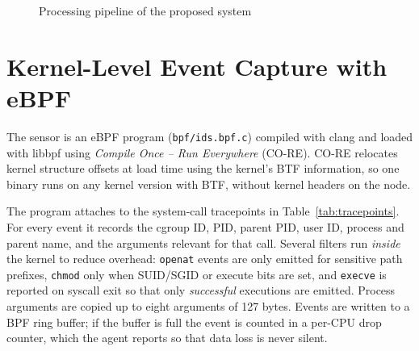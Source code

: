 \begin{figure}[H]
\caption{Processing pipeline of the proposed system}
\label{fig:pipeline}
\end{figure}

\section{Kernel-Level Event Capture with eBPF}

The sensor is an eBPF program (\texttt{bpf/ids.bpf.c}) compiled with clang and loaded
with libbpf using \emph{Compile Once -- Run Everywhere} (CO-RE). CO-RE relocates
kernel structure offsets at load time using the kernel's BTF information, so one binary
runs on any kernel version with BTF, without kernel headers on the node.

The program attaches to the system-call tracepoints in Table~\ref{tab:tracepoints}.
For every event it records the cgroup ID, PID, parent PID, user ID, process and parent
name, and the arguments relevant for that call. Several filters run \emph{inside} the
kernel to reduce overhead: \texttt{openat} events are only emitted for sensitive path
prefixes, \texttt{chmod} only when SUID/SGID or execute bits are set, and
\texttt{execve} is reported on syscall exit so that only \emph{successful} executions are
emitted. Process arguments are copied up to eight arguments of 127 bytes. Events are
written to a BPF ring buffer; if the buffer is full the event is counted in a per-CPU
drop counter, which the agent reports so that data loss is never silent.

